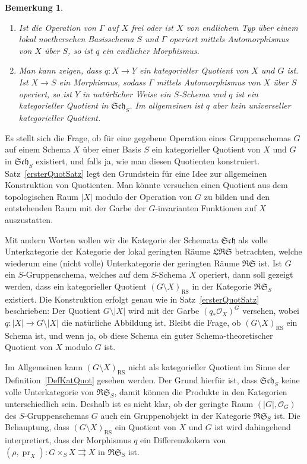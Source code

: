 \documentclass[DIV11,11pt]{scrartcl}
\theoremstyle{Definitionen}
\newtheorem{Bem}[Def]{Bemerkung}
\theoremstyle{Aussagen}
\DeclareMathOperator{\pr}{pr}
\begin{document}
\begin{Bem}
\begin{enumerate}
\item Ist die Operation von $\Gamma$ auf $X$ frei oder ist $X$ von endlichem Typ über einem lokal noetherschen Basisschema $S$ und $\Gamma$ operiert mittels Automorphismus von $X$ über $S$, so ist $q$ ein endlicher Morphismus.
\item Man kann zeigen, dass $q\colon X\rightarrow Y$ ein kategorieller Quotient von $X$ und $G$ ist. Ist $X\rightarrow S$ ein Morphismus, sodass $\Gamma$ mittels Automorphismus von $X$ über $S$ operiert, so ist $Y$ in natürlicher Weise ein $S$-Schema und $q$ ist ein kategorieller Quotient in $\mathfrak{Sch}_S$. Im allgemeinen ist $q$ aber kein universeller kategorieller Quotient.
\end{enumerate}
\end{Bem}

Es stellt sich die Frage, ob für eine gegebene Operation eines Gruppenschemas $G$ auf einem Schema $X$ über einer Basis $S$ ein kategorieller Quotient von $X$ und $G$ in $\mathfrak{Sch}_S$ existiert, und falls ja, wie man diesen Quotienten konstruiert. Satz~\ref{ersterQuotSatz} legt den Grundstein für eine Idee zur allgemeinen Konstruktion von Quotienten. Man könnte versuchen einen Quotient aus dem topologischen Raum $\left|X\right|$ modulo der Operation von $G$ zu bilden und den entstehenden Raum mit der Garbe der $G$-invarianten Funktionen auf $X$ auszustatten.

Mit andern Worten wollen wir die Kategorie der Schemata $\mathfrak{Sch}$ als volle Unterkategorie der Kategorie der lokal geringten Räume $\mathfrak{LRS}$ betrachten, welche wiederum eine (nicht volle) Unterkategorie der geringten Räume $\mathfrak{RS}$ ist. Ist $G$ ein $S$-Gruppenschema, welches auf dem $S$-Schema $X$ operiert, dann soll gezeigt werden, dass ein kategorieller Quotient $(G\setminus X)_{\text{RS}}$ in der Kategorie $\mathfrak{RS}_S$ existiert. Die Konstruktion erfolgt genau wie in Satz~\ref{ersterQuotSatz} beschrieben: Der Quotient $G\setminus\left|X\right|$ wird mit der Garbe $(q_*\mathcal{O}_X)^G$ versehen, wobei $q\colon \left|X\right|\rightarrow G\setminus\left|X\right|$ die natürliche Abbildung ist. Bleibt die Frage, ob $(G\setminus X)_{\text{RS}}$ ein Schema ist, und wenn ja, ob diese Schema ein \glqq guter\grqq{} Schema-theoretischer Quotient von $X$ modulo $G$ ist.

Im Allgemeinen kann $(G\setminus X)_{\text{RS}}$ nicht als kategorieller Quotient im Sinne der Definition~\ref{DefKatQuot} gesehen werden. Der Grund hierfür ist, dass $\mathfrak{Sch}_S$ keine volle Unterkategorie von $\mathfrak{RS}_S$, damit können die Produkte in den Kategorien unterschiedlich sein. Deshalb ist es nicht klar, ob der geringte Raum $(\left|G\right|,\mathcal{O}_G)$ des $S$-Gruppenschemas $G$ auch ein Gruppenobjekt in der Kategorie $\mathfrak{RS}_S$ ist. Die Behauptung, dass $(G\setminus X)_{\text{RS}}$ ein Quotient von $X$ und $G$ ist wird dahingehend interpretiert, dass der Morphismus $q$ ein Differenzkokern von $(\rho,\pr_X)\colon G\times_S X\rightrightarrows X$ in $\mathfrak{RS}_S$ ist.
\end{document}
